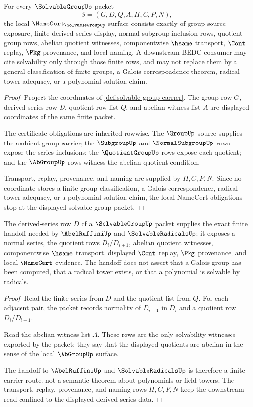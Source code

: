 \begin{theorem}
\label{thm:solvable-group-namecert-obligations}
For every $\SolvableGroupUp$ packet
$$
S=(G,D,Q,A,H,C,P,N),
$$
the local $\NameCert_{\SolvableGroupUp}$ surface consists exactly of group-source exposure, finite derived-series display, normal-subgroup inclusion rows, quotient-group rows, abelian quotient witnesses, componentwise $\hsame$ transport, $\Cont$ replay, $\Pkg$ provenance, and local naming. A downstream BEDC consumer may cite solvability only through those finite rows, and may not replace them by a general classification of finite groups, a Galois correspondence theorem, radical-tower adequacy, or a polynomial solution claim.
\end{theorem}
\begin{proof}
Project the coordinates of \autoref{def:solvable-group-carrier}. The group row $G$, derived-series row $D$, quotient row list $Q$, and abelian witness list $A$ are displayed coordinates of the same finite packet.

The certificate obligations are inherited rowwise. The $\GroupUp$ source supplies the ambient group carrier; the $\SubgroupUp$ and $\NormalSubgroupUp$ rows expose the series inclusions; the $\QuotientGroupUp$ rows expose each quotient; and the $\AbGroupUp$ rows witness the abelian quotient condition.

Transport, replay, provenance, and naming are supplied by $H,C,P,N$. Since no coordinate stores a finite-group classification, a Galois correspondence, radical-tower adequacy, or a polynomial solution claim, the local NameCert obligations stop at the displayed solvable-group packet.
\end{proof}

\begin{theorem}
\label{thm:solvable-group-derived-series-handoff}
The derived-series row $D$ of a $\SolvableGroupUp$ packet supplies the exact finite handoff needed by $\AbelRuffiniUp$ and $\SolvableRadicalsUp$: it exposes a normal series, the quotient rows $D_i/D_{i+1}$, abelian quotient witnesses, componentwise $\hsame$ transport, displayed $\Cont$ replay, $\Pkg$ provenance, and local $\NameCert$ evidence. The handoff does not assert that a Galois group has been computed, that a radical tower exists, or that a polynomial is solvable by radicals.
\end{theorem}
\begin{proof}
Read the finite series from $D$ and the quotient list from $Q$. For each adjacent pair, the packet records normality of $D_{i+1}$ in $D_i$ and a quotient row $D_i/D_{i+1}$.

Read the abelian witness list $A$. These rows are the only solvability witnesses exported by the packet: they say that the displayed quotients are abelian in the sense of the local $\AbGroupUp$ surface.

The handoff to $\AbelRuffiniUp$ and $\SolvableRadicalsUp$ is therefore a finite carrier route, not a semantic theorem about polynomials or field towers. The transport, replay, provenance, and naming rows $H,C,P,N$ keep the downstream read confined to the displayed derived-series data.
\end{proof}

